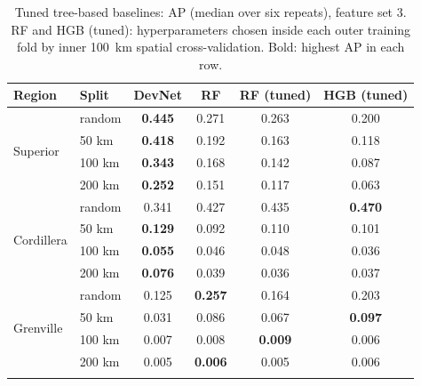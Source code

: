 \documentclass[pdflatex,sn-apa]{sn-jnl}
\begin{document}
\begin{table}[t]
\caption{Tuned tree-based baselines: AP (median over six repeats), feature set 3. RF and HGB (tuned): hyperparameters chosen inside each outer training fold by inner 100~km spatial cross-validation. Bold: highest AP in each row.}\label{tab:controls}
\footnotesize
\setlength{\tabcolsep}{3pt}
\begin{tabular*}{\textwidth}{@{\extracolsep\fill}llcccc}
\toprule
Region & Split & DevNet & RF & RF (tuned) & HGB (tuned) \\
\midrule
\multirow{4}{*}{Superior} & random & \textbf{0.445} & 0.271 & 0.263 & 0.200 \\
 & 50 km & \textbf{0.418} & 0.192 & 0.163 & 0.118 \\
 & 100 km & \textbf{0.343} & 0.168 & 0.142 & 0.087 \\
 & 200 km & \textbf{0.252} & 0.151 & 0.117 & 0.063 \\
\midrule
\multirow{4}{*}{Cordillera} & random & 0.341 & 0.427 & 0.435 & \textbf{0.470} \\
 & 50 km & \textbf{0.129} & 0.092 & 0.110 & 0.101 \\
 & 100 km & \textbf{0.055} & 0.046 & 0.048 & 0.036 \\
 & 200 km & \textbf{0.076} & 0.039 & 0.036 & 0.037 \\
\midrule
\multirow{4}{*}{Grenville} & random & 0.125 & \textbf{0.257} & 0.164 & 0.203 \\
 & 50 km & 0.031 & 0.086 & 0.067 & \textbf{0.097} \\
 & 100 km & 0.007 & 0.008 & \textbf{0.009} & 0.006 \\
 & 200 km & 0.005 & \textbf{0.006} & 0.005 & 0.006 \\
\botrule
\end{tabular*}
\end{table}
\end{document}
